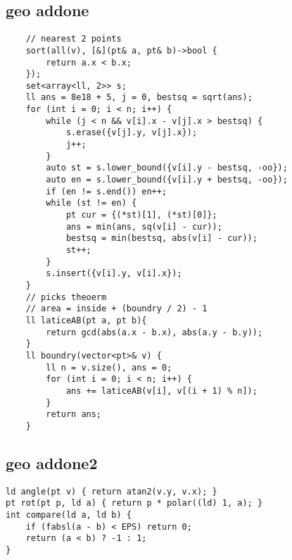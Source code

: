 \documentclass[twoside]{article}
\begin{document}
\begin{multicols*}{2}
{\subsection*{geo addone}
}
\begin{verbatim}
    // nearest 2 points
    sort(all(v), [&](pt& a, pt& b)->bool {
        return a.x < b.x;
    });
    set<array<ll, 2>> s;
    ll ans = 8e18 + 5, j = 0, bestsq = sqrt(ans);
    for (int i = 0; i < n; i++) {
        while (j < n && v[i].x - v[j].x > bestsq) {
            s.erase({v[j].y, v[j].x});
            j++;
        }
        auto st = s.lower_bound({v[i].y - bestsq, -oo});
        auto en = s.lower_bound({v[i].y + bestsq, -oo});
        if (en != s.end()) en++;
        while (st != en) {
            pt cur = {(*st)[1], (*st)[0]};
            ans = min(ans, sq(v[i] - cur));
            bestsq = min(bestsq, abs(v[i] - cur));
            st++;
        }
        s.insert({v[i].y, v[i].x});
    }
    // picks theoerm
    // area = inside + (boundry / 2) - 1
    ll laticeAB(pt a, pt b){
        return gcd(abs(a.x - b.x), abs(a.y - b.y));
    }
    ll boundry(vector<pt>& v) {
        ll n = v.size(), ans = 0;
        for (int i = 0; i < n; i++) {
            ans += laticeAB(v[i], v[(i + 1) % n]);
        }
        return ans;
    }
\end{verbatim}

{
\subsection*{geo addone2}
}
\begin{verbatim}
ld angle(pt v) { return atan2(v.y, v.x); }
pt rot(pt p, ld a) { return p * polar((ld) 1, a); }
int compare(ld a, ld b) {
    if (fabsl(a - b) < EPS) return 0;
    return (a < b) ? -1 : 1;
}
\end{verbatim}

{
}
\end{multicols*}
\end{document}
